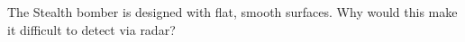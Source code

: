 The Stealth bomber is designed with flat, smooth
surfaces. Why would this make it difficult to detect via radar?
